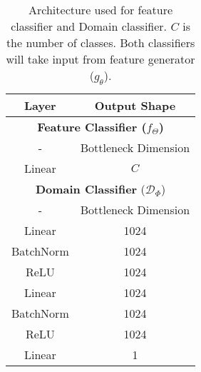 \documentclass[table,dvipsnames]{article}
\theoremstyle{plain}
\theoremstyle{definition}
\theoremstyle{remark}
\begin{document}
\begin{table*}[!tb]

    \begin{minipage}{.4\linewidth}
      \caption{Architecture used for feature classifier and Domain classifier. $C$ is the number of classes. Both classifiers will take input from feature generator ($g_\theta$).}
      \vskip 0.15in
      \label{tab:clf}
      \centering
    \begin{tabular}{c||c}
    \hline
      Layer  &  Output Shape\\
      \hline
      \multicolumn{2}{c}{\textbf{Feature Classifier ($f_{\Theta}$)}} \\
      \hline
        - & Bottleneck Dimension \\
        Linear & $C$ \\
        \hline
        \multicolumn{2}{c}{\textbf{Domain Classifier} ($\mathcal{D}_\Phi$)} \\
        \hline
        - & Bottleneck Dimension \\
        Linear & 1024 \\
        BatchNorm & 1024 \\
        ReLU & 1024 \\
        Linear & 1024 \\
        BatchNorm & 1024 \\
        ReLU & 1024 \\
        Linear & 1 \\
       

\end{tabular}
\end{minipage}
\end{table*}
\end{document}
